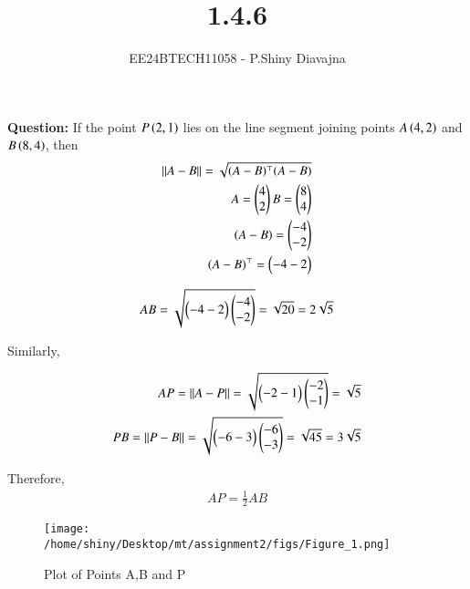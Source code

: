 \documentclass[journal]{IEEEtran}
\begin{document}

\vspace{3cm}

\title{1.4.6}
\author{EE24BTECH11058 - P.Shiny Diavajna}
{\let\newpage\relax\maketitle}

\renewcommand{\thefigure}{\theenumi}
\renewcommand{\thetable}{\theenumi}
\setlength{\intextsep}{10pt} %


\renewcommand{\thetable}{\theenumi}

\textbf{Question:} If the point $P\left(2,1\right)$ lies on the line segment joining points $A\left(4,2\right)$ and $B\left(8,4\right)$, then \\

   \solution 
   \begin{align}
      ||A-B||=\sqrt{(A-B)^\top(A-B)}\\
      A=\begin{pmatrix}4\\2\end{pmatrix} B=\begin{pmatrix}8\\4\end{pmatrix}\\
      (A-B)=\begin{pmatrix}-4\\-2\end{pmatrix}\\
      (A-B)^\top=\begin{pmatrix}-4 -2\end{pmatrix}
   \end{align}

   \begin{align}
      AB=\sqrt{\begin{pmatrix}-4 -2\end{pmatrix} \begin{pmatrix}-4\\-2\end{pmatrix}} =\sqrt{20}=2\sqrt{5}\\
   \end{align}
   
   Similarly,

   \begin{align}
      AP=||A-P||=\sqrt{\begin{pmatrix}-2 -1\end{pmatrix} \begin{pmatrix}-2\\-1\end{pmatrix}}=\sqrt{5}\\
      PB=||P-B||=\sqrt{\begin{pmatrix}-6 -3\end{pmatrix} \begin{pmatrix}-6\\-3\end{pmatrix}}=\sqrt{45}=3\sqrt{5}\\
   \end{align}

 Therefore,
 \begin{align}
     AP=\frac{1}{2}AB
 \end{align}

  \begin{figure}[h]
    \centering
    \texttt{[image: /home/shiny/Desktop/mt/assignment2/figs/Figure\_1.png]}
    \caption{Plot of Points A,B and P}
 \end{figure}

  
   
   
   
\end{document}
